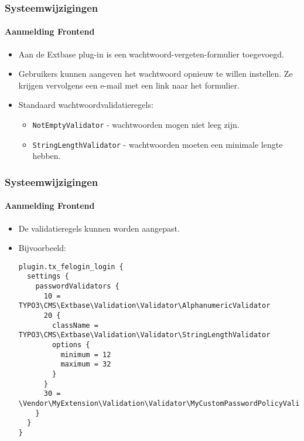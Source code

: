 
\begin{frame}[fragile]
	\frametitle{Systeemwijzigingen}
	\framesubtitle{Aanmelding Frontend}

	\begin{itemize}

		\item Aan de Extbase plug-in is een wachtwoord-vergeten-formulier toegevoegd.
		\item Gebruikers kunnen aangeven het wachtwoord opnieuw te willen instellen. Ze krijgen vervolgens een e-mail met een link naar het formulier.
		\item Standaard wachtwoordvalidatieregels:

			\begin{itemize}
				\item \texttt{NotEmptyValidator} - wachtwoorden mogen niet leeg zijn.
				\item \texttt{StringLengthValidator} - wachtwoorden moeten een minimale lengte hebben.
			\end{itemize}

	\end{itemize}

\end{frame}


\begin{frame}[fragile]
	\frametitle{Systeemwijzigingen}
	\framesubtitle{Aanmelding Frontend}

	\lstset{basicstyle=\tiny\ttfamily}

	\begin{itemize}
		\item De validatieregels kunnen worden aangepast.
		\item Bijvoorbeeld:
\begin{lstlisting}
plugin.tx_felogin_login {
  settings {
    passwordValidators {
      10 = TYPO3\CMS\Extbase\Validation\Validator\AlphanumericValidator
      20 {
        className = TYPO3\CMS\Extbase\Validation\Validator\StringLengthValidator
        options {
          minimum = 12
          maximum = 32
        }
      }
      30 = \Vendor\MyExtension\Validation\Validator\MyCustomPasswordPolicyValidator
    }
  }
}
\end{lstlisting}

	\end{itemize}

\end{frame}

